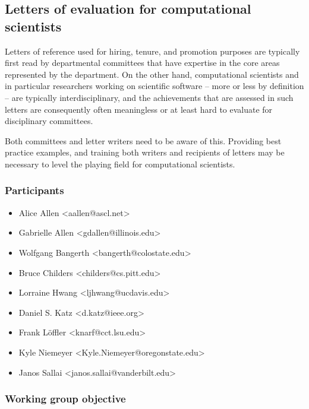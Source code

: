 \subsection{Letters of evaluation for computational scientists}
\label{sec:letters}


Letters of reference used for hiring, tenure, and promotion purposes
are typically first read by departmental committees that have
expertise in the core areas represented by the department. On the
other hand, computational scientists and in particular researchers
working on scientific software -- more or less by definition --
are typically interdisciplinary, and the achievements that are
assessed in such letters are consequently often meaningless or at
least hard to evaluate for disciplinary committees.

Both committees and letter writers need to be aware of this. Providing
best practice examples, and training both writers and recipients of
letters may be necessary to level the playing field for computational
scientists.

\subsubsection{Participants}

\begin{itemize}
\item Alice Allen <aallen@ascl.net>
\item Gabrielle Allen <gdallen@illinois.edu>
\item Wolfgang Bangerth <bangerth@colostate.edu>
\item Bruce Childers <childers@cs.pitt.edu>
\item Lorraine Hwang <ljhwang@ucdavis.edu>
\item Daniel S. Katz <d.katz@ieee.org>
\item Frank L{\"o}ffler <knarf@cct.lsu.edu>
\item Kyle Niemeyer <Kyle.Niemeyer@oregonstate.edu>
\item Janos Sallai <janos.sallai@vanderbilt.edu>
\end{itemize}

\subsubsection{Working group objective}

